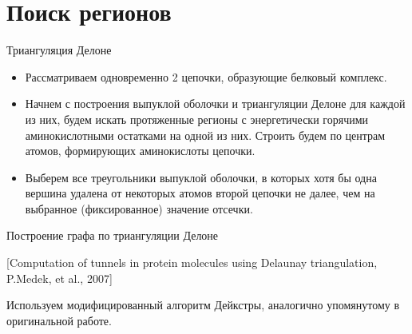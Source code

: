 \documentclass[12pt, xcolor={dvipsnames}]{beamer}
\begin{document}
\section{Поиск регионов}
\begin{frame}{Триангуляция Делоне}
\begin{itemize}
\item Рассматриваем одновременно 2 цепочки, образующие белковый комплекс.
\item Начнем с построения выпуклой оболочки и триангуляции Делоне для каждой из них, будем искать протяженные регионы с энергетически горячими аминокислотными остатками  на одной из них. Строить будем по центрам атомов, формирующих аминокислоты цепочки.
\item Выберем все треугольники выпуклой оболочки, в которых хотя бы одна вершина удалена от некоторых атомов второй цепочки не далее, чем на выбранное (фиксированное) значение отсечки.
\end{itemize}
\end{frame}

\begin{frame}{Построение графа по триангуляции Делоне}
\begin{center}

[Computation of tunnels in protein molecules using
Delaunay triangulation, P.Medek, et al., 2007]
\end{center}

Используем модифицированный алгоритм Дейкстры, аналогично упомянутому в оригинальной работе.
\end{frame}
\end{document}
